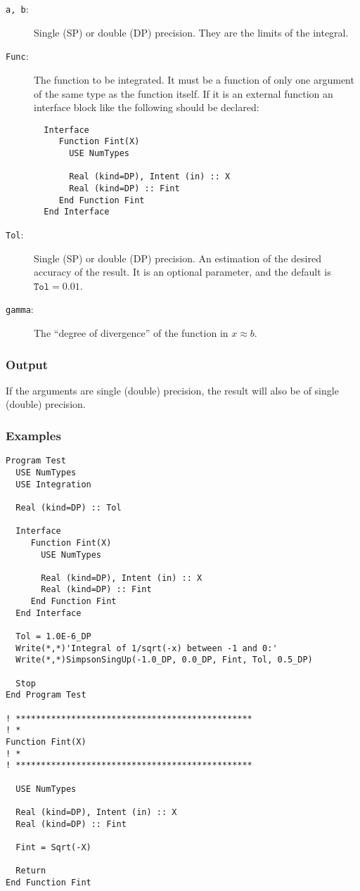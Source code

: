 \begin{description}
\item[\texttt{a, b}:] Single (SP) or double (DP) precision. They are
  the limits of the integral.
\item[\texttt{Func}:] The function to be integrated. It must be a
  function of only one argument of the same type as the function
  itself. If it is an
  external function an interface block like the following should be
  declared: 
\begin{verbatim}
  Interface 
     Function Fint(X)
       USE NumTypes

       Real (kind=DP), Intent (in) :: X
       Real (kind=DP) :: Fint
     End Function Fint
  End Interface
\end{verbatim}
\item[\texttt{Tol}:] Single (SP) or double (DP) precision. An
  estimation of the desired accuracy of the result. It is an optional
  parameter, and the default is $\mathtt{Tol} = 0.01$. 
\item[\texttt{gamma}:] The ``degree of divergence'' of the function in
  $x\approx b$. 
\end{description}


\subsubsection{Output}

If the arguments are single (double) precision, the result will also be of
single (double) precision. 


\subsubsection{Examples}

\begin{verbatim}
Program Test
  USE NumTypes
  USE Integration

  Real (kind=DP) :: Tol

  Interface 
     Function Fint(X)
       USE NumTypes

       Real (kind=DP), Intent (in) :: X
       Real (kind=DP) :: Fint
     End Function Fint
  End Interface

  Tol = 1.0E-6_DP
  Write(*,*)'Integral of 1/sqrt(-x) between -1 and 0:'
  Write(*,*)SimpsonSingUp(-1.0_DP, 0.0_DP, Fint, Tol, 0.5_DP)

  Stop
End Program Test

! ***********************************************
! *
Function Fint(X)
! *  
! ***********************************************

  USE NumTypes

  Real (kind=DP), Intent (in) :: X
  Real (kind=DP) :: Fint

  Fint = Sqrt(-X)

  Return
End Function Fint
\end{verbatim}

